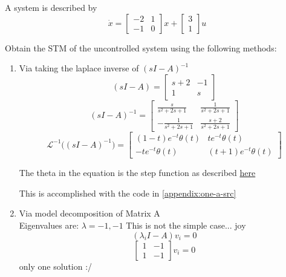 \item A system is described by
  \begin{equation}
\dot x = \begin{bmatrix}
-2 & 1\\
-1 & 0
\end{bmatrix}
x + \begin{bmatrix}
3\\
1
\end{bmatrix}
u\end{equation}

  Obtain the STM of the uncontrolled system using the following methods:
  \begin{enumerate}
  \item Via taking the laplace inverse of $(sI - A)^{-1}$ \\
    \begin{equation}
(sI-A) = \left[\begin{matrix}s + 2 & -1\\1 & s\end{matrix}\right]\end{equation}
\begin{equation}
(sI-A)^{-1} = \left[\begin{matrix}\frac{s}{s^{2} + 2 s + 1} & \frac{1}{s^{2} + 2 s + 1}\\- \frac{1}{s^{2} + 2 s + 1} & \frac{s + 2}{s^{2} + 2 s + 1}\end{matrix}\right]\end{equation}
\begin{equation}
\mathscr{L}^{-1}\Big ((sI-A)^{-1}\Big ) = \left[\begin{matrix}\left(1 - t\right) e^{- t} \theta\left(t\right) & t e^{- t} \theta\left(t\right)\\- t e^{- t} \theta\left(t\right) & \left(t + 1\right) e^{- t} \theta\left(t\right)\end{matrix}\right]\end{equation}

    
    The theta in the equation is the step function as described
    \href{https://math.stackexchange.com/questions/1967109/inverse-laplace-transfrom-using-sympy}{here}
    
    This is accomplished with the code in \autoref{appendix:one-a-src}
  \item Via model decomposition of Matrix A \\
    Eigenvalues are: $\lambda = -1, -1$
    This is not the simple case... joy
    \begin{equation}
      (\lambda_iI -A)v_i = 0
    \end{equation}
    \begin{equation}
      \begin{bmatrix}
        1 & -1 \\
        1 &  -1
      \end{bmatrix}v_i = 0
    \end{equation}
    only one solution :/


\end{enumerate}

